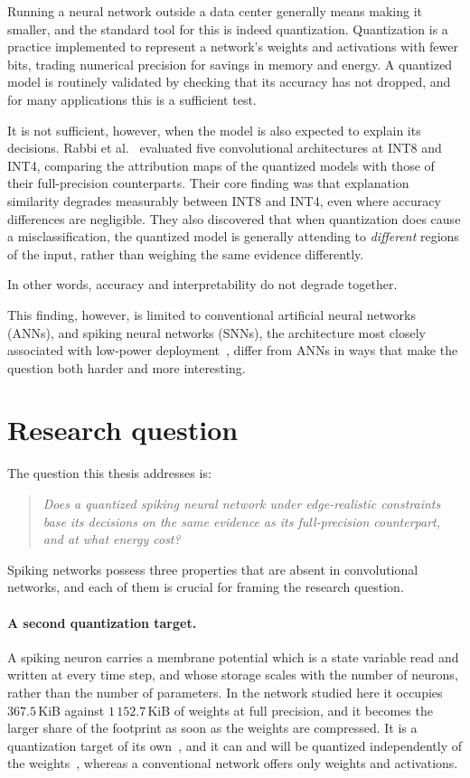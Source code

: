 Running a neural network outside a data center generally means making it smaller,
and the standard tool for this is indeed quantization. Quantization is a practice implemented
to represent a network's weights and activations with fewer bits, trading numerical precision
for savings in memory and energy. A quantized model is routinely validated by checking that its accuracy
has not dropped, and for many applications this is a sufficient test.

It is not sufficient, however, when the model is also expected to explain its
decisions. Rabbi et al.~\cite{rabbi2026} evaluated five convolutional architectures
at INT8 and INT4, comparing the attribution maps of the quantized models with those
of their full-precision counterparts. Their core finding was that explanation similarity
degrades measurably between INT8 and INT4, even where accuracy differences are
negligible. They also discovered that when quantization does cause a misclassification,
the quantized model is generally attending to \emph{different} regions of the input,
rather than weighing the same evidence differently.

In other words, accuracy and interpretability do not degrade together.

This finding, however, is limited to conventional artificial neural networks (ANNs), and
spiking neural networks (SNNs), the architecture most closely associated with
low-power deployment~\cite{roy2019towards}, differ from ANNs in ways that make the
question both harder and more interesting.

\section{Research question}

The question this thesis addresses is:

\begin{quote}
\emph{Does a quantized spiking neural network under edge-realistic constraints
base its decisions on the same evidence as its full-precision counterpart, and
at what energy cost?}
\end{quote}

Spiking networks possess three properties that are absent in convolutional networks,
and each of them is crucial for framing the research question.

\paragraph{A second quantization target.} A spiking neuron carries a membrane
potential which is a state variable read and written at every time step, and whose storage
scales with the number of neurons, rather than the number of parameters. In the
network studied here it occupies $367.5$\,KiB against $1\,152.7$\,KiB of weights
at full precision, and it becomes the larger share of the footprint as soon as
the weights are compressed. It is a quantization target of its
own~\cite{yin2024mint}, and it can and will be quantized independently of the
weights~\cite{smith2026}, whereas a conventional network offers only weights and
activations.

